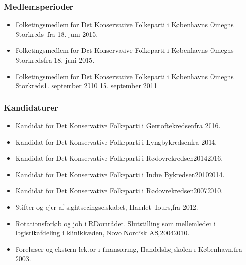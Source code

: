 \documentclass[11pt, a4paper]{awesome-cv}
\begin{document}
\begin{cvletter}
\subsubsection*{Medlemsperioder}
\begin{itemize}
\item Folketingsmedlem for Det Konservative Folkeparti i Københavns Omegns Storkreds fra 18. juni 2015.
\item Folketingsmedlem for Det Konservative Folkeparti i Københavns Omegns Storkredsfra 18. juni 2015.
\item Folketingsmedlem for Det Konservative Folkeparti i Københavns Omegns Storkreds1. september 2010  15. september 2011.
\end{itemize}
\subsubsection*{Kandidaturer}
\begin{itemize}
\item Kandidat for Det Konservative Folkeparti i Gentoftekredsenfra 2016.
\item Kandidat for Det Konservative Folkeparti i Lyngbykredsenfra 2014.
\item Kandidat for Det Konservative Folkeparti i Rødovrekredsen20142016.
\item Kandidat for Det Konservative Folkeparti i Indre Bykredsen20102014.
\item Kandidat for Det Konservative Folkeparti i Rødovrekredsen20072010.
\end{itemize}
\begin{itemize}
\item Stifter og ejer af sightseeingselskabet, Hamlet Tours,fra 2012.
\item Rotationsforløb og job i RDområdet. Slutstilling som mellemleder i logistikafdeling i klinikkæden, Novo Nordisk AS,20042010.
\item Forelæser og ekstern lektor i finansiering, Handelshøjskolen i København,fra 2003.
\end{itemize}
\end{cvletter}
\end{document}
